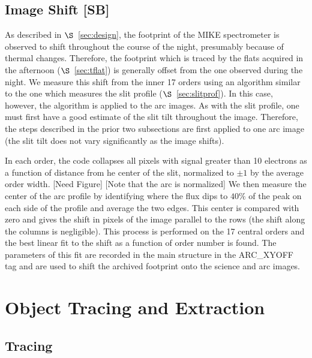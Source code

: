 \documentclass[12pt,preprint]{aastex}
\begin{document}
\subsection{Image Shift {\bf [SB]}}
\label{sec:shift}

As described in $\S$~\ref{sec:design}, the footprint of the
MIKE spectrometer is observed to shift throughout the course
of the night, presumably because of thermal changes. 
Therefore, the footprint which is traced by the
flats acquired in the afternoon ($\S$~\ref{sec:tflat})
is generally offset from the one observed during the night.
We measure this shift from the inner 17 orders using
an algorithm similar to the one which measures the slit
profile ($\S$~\ref{sec:slitprof}).  In this case, however,
the algorithm is applied to the arc images.  As with the slit
profile, one must first have a good estimate of the slit
tilt throughout the image.  Therefore, the steps described in
the prior two subsections are first applied to one arc image
(the slit tilt does not vary significantly as the image shifts).

In each order,  the code collapses all pixels
with signal greater than 10 electrons as a function of 
distance from he center of the slit, normalized to
$\pm 1$ by the average order width.  [Need Figure]
[Note that the arc is normalized]  We then measure the
center of the arc profile by identifying where the flux
dips to $40\%$ of the peak on each side of the profile
and average the two edges.  This center is compared with
zero and gives the shift in pixels of the image parallel
to the rows (the shift along the columns is negligible).
This process is performed on the 17 central orders and the best
linear fit to the shift as a function of order number is found.  
The parameters of this fit are recorded in the main structure 
in the ARC\_XYOFF tag and are
used to shift the archived footprint onto the science and
arc images.

%

 
\section{Object Tracing and Extraction}
\label{sec:object}

\subsection{Tracing}
\end{document}
